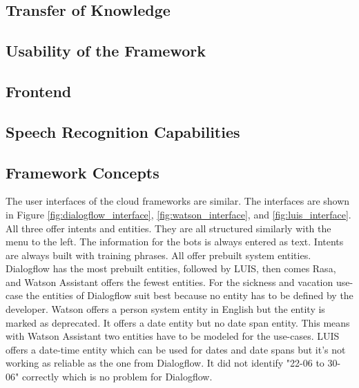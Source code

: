 \subsection*{Transfer of Knowledge}
\subsection*{Usability of the Framework}
\subsection*{Frontend}
\subsection*{Speech Recognition Capabilities}

\subsection*{Framework Concepts}
The user interfaces of the cloud frameworks are similar.
The interfaces are shown in Figure \ref{fig:dialogflow_interface},
\ref{fig:watson_interface}, and \ref{fig:luis_interface}.
All three offer intents and entities.
They are all structured similarly with the menu to the left.
The information for the bots is always entered as text.
Intents are always built with training phrases.
All offer prebuilt system entities.
Dialogflow has the most prebuilt entities, followed by LUIS,
then comes Rasa, and Watson Assistant offers the fewest entities.
For the sickness and vacation use-case the entities of 
Dialogflow suit best because no entity has to be defined by 
the developer. 
Watson offers a person system entity in English but the entity
is marked as deprecated.
It offers a date entity but no date span entity.
This means with Watson Assistant two entities have to be 
modeled for the use-cases.
LUIS offers a date-time entity which can be used for dates and 
date spans but it's not working as reliable as the one from 
Dialogflow.
It did not identify "22-06 to 30-06" correctly
which is no problem for Dialogflow.
